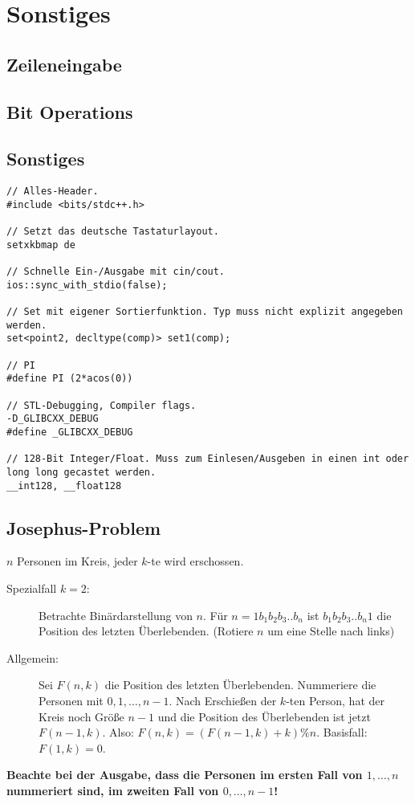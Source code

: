 \section{Sonstiges}

\subsection{Zeileneingabe}


\subsection{Bit Operations}


\subsection{Sonstiges}
\begin{lstlisting}
// Alles-Header.
#include <bits/stdc++.h>

// Setzt das deutsche Tastaturlayout.
setxkbmap de

// Schnelle Ein-/Ausgabe mit cin/cout.
ios::sync_with_stdio(false);

// Set mit eigener Sortierfunktion. Typ muss nicht explizit angegeben werden.
set<point2, decltype(comp)> set1(comp);

// PI
#define PI (2*acos(0))

// STL-Debugging, Compiler flags.
-D_GLIBCXX_DEBUG
#define _GLIBCXX_DEBUG

// 128-Bit Integer/Float. Muss zum Einlesen/Ausgeben in einen int oder long long gecastet werden.
__int128, __float128
\end{lstlisting}

\subsection{Josephus-Problem}
$n$ Personen im Kreis, jeder $k$-te wird erschossen.
\begin{description}
	\item[Spezialfall $k=2$:] Betrachte Binärdarstellung von $n$.
	Für $n = 1b_1b_2b_3..b_n$ ist $b_1b_2b_3..b_n1$ die Position des letzten Überlebenden.
	(Rotiere $n$ um eine Stelle nach links)
	
	\item[Allgemein:] Sei $F(n,k)$ die Position des letzten Überlebenden.
	Nummeriere die Personen mit $0, 1, \ldots, n-1$.
	Nach Erschießen der $k$-ten Person, hat der Kreis noch Größe $n-1$ und die Position des Überlebenden ist jetzt $F(n-1,k)$.
	Also: $F(n,k) = (F(n-1,k)+k)\%n$. Basisfall: $F(1,k) = 0$. 
	
\end{description}
\textbf{Beachte bei der Ausgabe, dass die Personen im ersten Fall von $1, \ldots, n$ nummeriert sind, im zweiten Fall von $0, \ldots, n-1$!}

